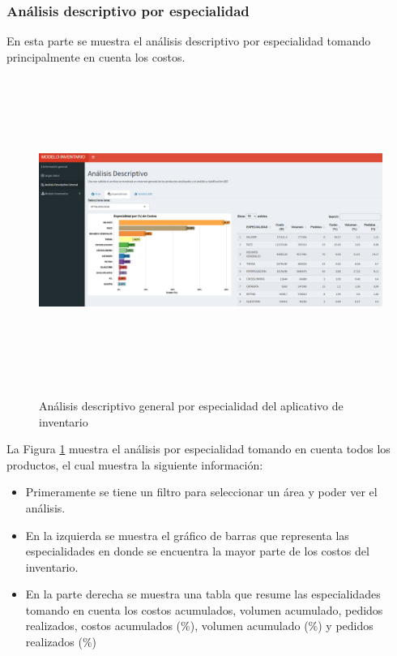 \subsubsection{Análisis descriptivo por especialidad}
En esta parte se muestra el análisis descriptivo por especialidad tomando principalmente en cuenta los costos.
\clearpage
\begin{figure}[H]
  \caption{Análisis descriptivo general por especialidad del aplicativo de inventario}
  {\includegraphics[width=16cm, height=10cm]{images/Shiny4.png}}
  \label{fig:Shiny4}
\end{figure}

La Figura \ref{fig:Shiny4} muestra el análisis por especialidad tomando en cuenta todos los productos, el cual muestra la siguiente información:

\begin{itemize}
  \item Primeramente se tiene un filtro para seleccionar un área y poder ver el análisis.
  \item En la izquierda se muestra el gráfico de barras que representa las especialidades en donde se encuentra la mayor parte de los costos del inventario.
  \item En la parte derecha se muestra una tabla que resume las especialidades tomando en cuenta los costos acumulados, volumen acumulado, pedidos realizados, costos acumulados ($\%$), volumen acumulado ($\%$) y pedidos realizados ($\%$)
\end{itemize}

